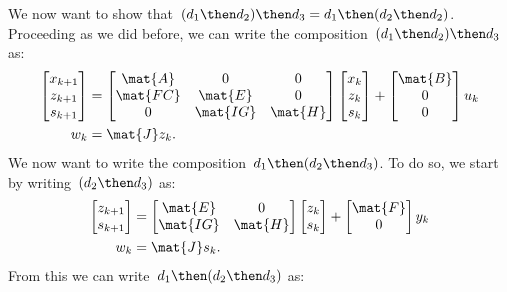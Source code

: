 We now want to show that~$(d_1\then d_2)\then d_3=d_1\then (d_2\then d_2)$.  Proceeding as we did before, we can write the composition~$(d_1\then d_2)\then d_3$ as:
\begin{equation*}
\label{eq:dlin-5}
\begin{aligned}
\begin{bmatrix}
x_{k+1}\\
z_{k+1}\\
s_{k+1}
\end{bmatrix}&=
\begin{bmatrix}
\mat{A}&0&0\\
\mat{FC}&\mat{E}&0\\
0&\mat{IG}&\mat{H}
\end{bmatrix}\begin{bmatrix} x_k\\ z_k\\ s_k\end{bmatrix}+
\begin{bmatrix}
\mat{B}\\ 0\\ 0
\end{bmatrix}u_k\\
w_k&=\mat{J}z_k.
\end{aligned}
\end{equation*}
We now want to write the composition~$d_1\then (d_2\then d_3)$. To do so, we start by writing~$(d_2\then d_3)$ as:
\begin{equation*}
\label{eq:dlin-6}
\begin{aligned}
\begin{bmatrix}
z_{k+1}\\
s_{k+1}
\end{bmatrix}&=
\begin{bmatrix}
\mat{E}&0\\
\mat{IG}&\mat{H}
\end{bmatrix}\begin{bmatrix} z_k\\ s_k\end{bmatrix}+
\begin{bmatrix}
\mat{F}\\ 0
\end{bmatrix}y_k\\
w_k&=\mat{J}s_k.
\end{aligned}
\end{equation*}
From this we can write~$d_1\then (d_2\then d_3)$ as:
